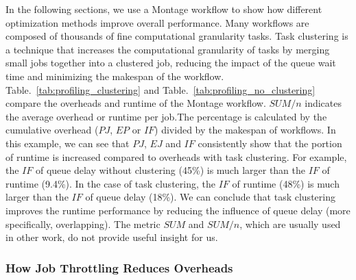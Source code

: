 In the following sections, we use a Montage workflow to show how different optimization methods improve overall performance. Many workflows are composed of thousands of fine computational granularity tasks. Task clustering is a technique that increases the computational granularity of tasks by merging small jobs together into a clustered job, reducing the impact of the queue wait time and minimizing the makespan of the workflow. Table.~\ref{tab:profiling_clustering} and Table.~\ref{tab:profiling_no_clustering} compare the overheads and runtime of the Montage workflow. $SUM/n$ indicates the average overhead or runtime per job.The percentage is calculated by the cumulative overhead ($PJ$, $EP$ or $IF$) divided by the makespan of workflows. 
In this example, we can see that $PJ$, $EJ$ and $IF$ consistently show that the portion of runtime is increased compared to overheads with task clustering. For example, the $IF$ of queue delay without clustering (45\%) is much larger than the $IF$ of runtime (9.4\%). In the case of task clustering, the $IF$ of runtime (48\%) is much larger than the $IF$ of queue delay (18\%). We can conclude that task clustering improves the runtime performance by reducing the influence of queue delay (more specifically, overlapping). The metric $SUM$ and $SUM/n$, which are usually used in other work, do not provide useful insight for us. 

\subsubsection{How Job Throttling Reduces Overheads}

